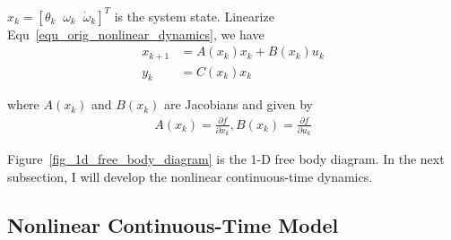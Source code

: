 \documentclass[12pt]{article}
\begin{document}
$x_k=[\theta_k\;\;\omega_k\;\;\dot{\omega}_k]^T$ is the system state. 
Linearize Equ~\ref{equ_orig_nonlinear_dynamics}, we have
\begin{align}
x_{k+1} & = A(x_k)x_k + B(x_k)u_k \\
y_k & = C(x_k)x_k
\end{align}

where $A(x_k)$ and $B(x_k)$ are Jacobians and given by
\begin{align}
A(x_k) = \frac{\partial f}{\partial x_k},
B(x_k) = \frac{\partial f}{\partial u_k}
\end{align}

Figure~\ref{fig_1d_free_body_diagram} is the 1-D free body diagram.
In the next subsection, I will develop the nonlinear continuous-time
dynamics.

\subsection{Nonlinear Continuous-Time Model}
\end{document}
